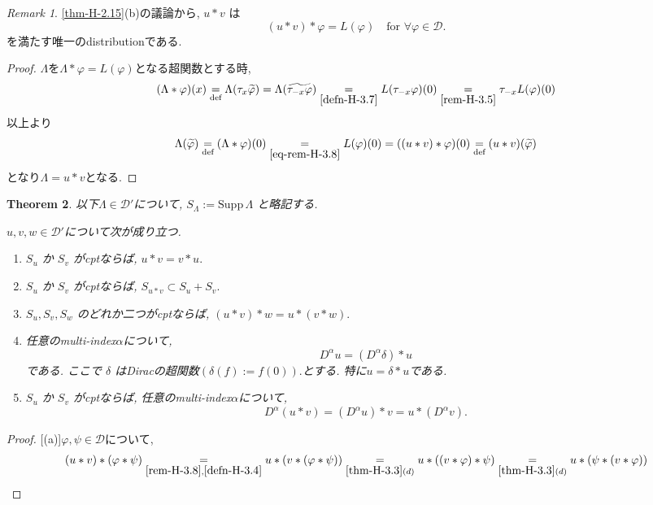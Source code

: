 \documentclass[dvipdfmx,a4paper,11pt]{article} %
\newtheorem{thm}{Theorem}[section]
\theoremstyle{definition}
\theoremstyle{remark}
\newtheorem{rem}[thm]{Remark}
\numberwithin{equation}{section}
\begin{document}
\begin{rem}%
\label{rem-H-3.8}
\ref{thm-H-2.15}(b)の議論から, \(u \ast v\) は
\[
(u \ast v) \ast \varphi = L(\varphi) \quad \text{for } \forall \varphi \in \mathcal{D}.
\]
を満たす唯一のdistributionである. 

\begin{proof}
$\Lambda$を$\Lambda\ast \varphi = L(\varphi) $となる超関数とする時, 
\begin{align}
\begin{split}
\label{eq-rem-H-3.8}
(\Lambda \ast \varphi)(x)
\underset{\text{def}}{=} \Lambda(\tau_x \widetilde{\varphi})
=\Lambda(\widetilde{ \tau_{-x} \varphi})
\underset{\ref{defn-H-3.7}}{=} L(\tau_{-x} \varphi)(0) \underset{\ref{rem-H-3.5}}{=}
\tau_{-x} L( \varphi)(0) \\
\end{split}
\end{align}
以上より
$$
\Lambda (\widetilde{\varphi})
\underset{\text{def}}{=}
(\Lambda \ast \varphi)(0)
\underset{\ref{eq-rem-H-3.8}}{=}
L( \varphi)(0)
=((u \ast v) \ast \varphi)(0)
\underset{\text{def}}{=}
(u \ast v)(\widetilde{\varphi})
$$
となり$\Lambda=u \ast v$となる. 
\end{proof}
\end{rem}


\begin{tcolorbox}[mybox]
\begin{thm}\cite[Theorem 6.37]{Rud}
\label{thm-H-3.7}
以下\(\Lambda \in \mathcal{D}'\)について,  \( S_\Lambda := \mathrm{Supp}\, \Lambda \) と略記する. 

\( u, v, w \in \mathcal{D}' \)について次が成り立つ. 
\begin{enumerate}[label=$(\alph*)$]
\item \(S_u\) か \(S_v\) がcptならば,  \(u \ast v = v \ast u.\)
\item\(S_u\) か \(S_v\) がcptならば,  \(S_{u \ast v} \subset S_u + S_v.\)
\item  \(S_u, S_v, S_w\) のどれか二つがcptならば,  \((u \ast v) \ast w = u \ast (v \ast w).\)
\item 任意のmulti-index\( \alpha\)について, 
\[
D^\alpha u = (D^\alpha \delta) \ast u
\]
である. ここで \(\delta\) はDiracの超関数\(\left(\delta(f) :=  f(0)\right).\)とする. 
特に\(u = \delta \ast u\)である. 
\item \(S_u\) か \(S_v\) がcptならば, 任意のmulti-index\( \alpha\)について, 
\[
D^\alpha (u \ast v) = (D^\alpha u) \ast v = u \ast (D^\alpha v).
\]
\end{enumerate}
\end{thm}
\end{tcolorbox}

\begin{proof}

[(a)]\(\varphi, \psi \in \mathcal{D}\)について, 
\[
(u \ast v) \ast (\varphi \ast \psi)
\underset{\ref{rem-H-3.8}, \ref{defn-H-3.4}}{=} u \ast (v \ast (\varphi \ast \psi))
\underset{\ref{thm-H-3.3}(d)}{=} u \ast ((v \ast \varphi) \ast \psi)
\underset{\ref{thm-H-3.3}(d)}{=} u \ast (\psi \ast (v \ast \varphi))
\]
\end{proof}
\end{document}

